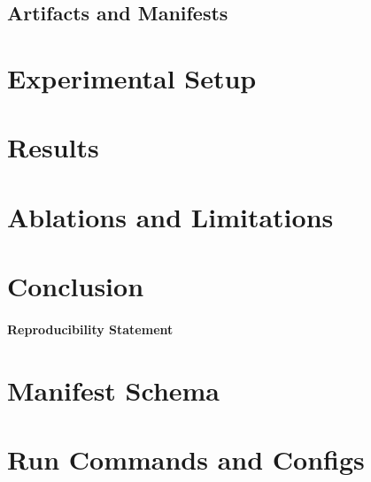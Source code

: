 \documentclass[11pt]{article}
\begin{document}
\subsection{Artifacts and Manifests}

\section{Experimental Setup}

\section{Results}

\section{Ablations and Limitations}

\section{Conclusion}

\paragraph{Reproducibility Statement}

\appendix
\section{Manifest Schema}

\section{Run Commands and Configs}
\end{document}
